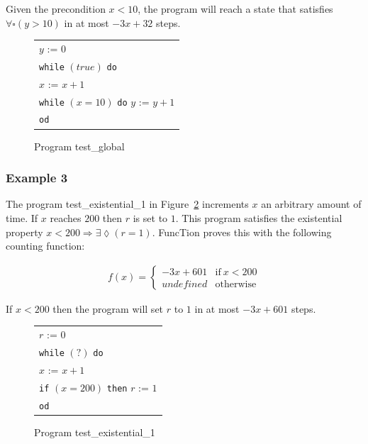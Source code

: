 \documentclass[11pt,a4paper,titlepage]{article}
\theoremstyle{definition}
\begin{document}
Given the precondition $x < 10$, the program will reach a state that satisfies $\forall\square(y > 10)$ in at most
$-3x + 32$ steps.

\begin{figure}
    \begin{center}
        \begin{tabular}{l}
            $y$ := $0$ \\
            \texttt{while} $(true)$ \texttt{do} \\
            \hspace{1em}$x$ := $x + 1$ \\
            \hspace{1em}\texttt{while} $(x = 10)$ \texttt{do} $y$ := $y + 1$ \\
            \texttt{od}
        \end{tabular}
    \end{center}
    \vspace{-1em}
    \caption{Program \textsf{test\_global}}
    \label{fig:test_global}
\end{figure}


\subsubsection*{Example 3}
The program \textsf{test\_existential\_1} in Figure~\ref{fig:test_existential_1} increments $x$ an arbitrary amount of time. If $x$ reaches $200$ then $r$
is set to $1$. This program satisfies the existential property $x < 200 \Rightarrow \exists\lozenge(r = 1)$. FuncTion
proves this with the following counting function:

\begin{align*}
f(x) = \begin{cases}
    -3x + 601  & \text{if} \ x < 200 \\
    undefined  & \text{otherwise}
\end{cases}
\end{align*}

If $x < 200$ then the program will set $r$ to $1$ in at most $-3x + 601$ steps.

\begin{figure}
    \begin{center}
        \begin{tabular}{l}
            $r$ := $0$ \\
            \texttt{while} $(?)$ \texttt{do} \\
            \hspace{1em}$x$ := $x + 1$ \\
            \hspace{1em}\texttt{if} $(x = 200)$ \texttt{then} $r$ := $1$ \\
            \texttt{od}
        \end{tabular}
    \end{center}
    \vspace{-1em}
    \caption{Program \textsf{test\_existential\_1}}
    \label{fig:test_existential_1}
\end{figure}
\end{document}
